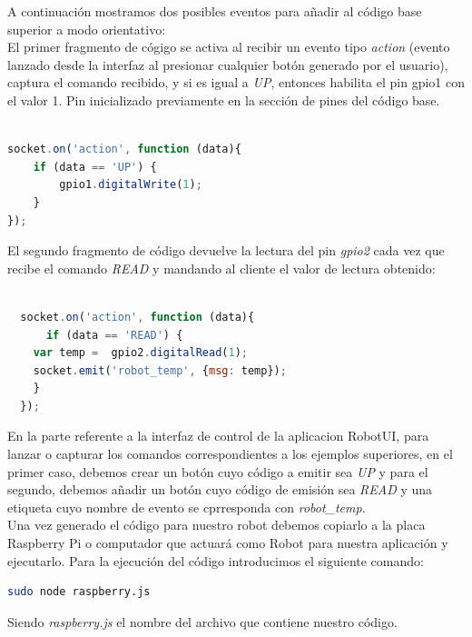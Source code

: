 A continuación mostramos dos posibles eventos para añadir al código base superior a modo orientativo:\\

El primer fragmento de cógigo se activa al recibir un evento tipo \emph{action} (evento lanzado desde la interfaz al presionar cualquier botón generado por el usuario), captura el comando recibido,
y si es igual a \emph{UP}, entonces habilita el pin gpio1 con el valor 1. Pin inicializado previamente en la sección de pines del código base.\\

\begin{lstlisting}[language=JavaScript]

socket.on('action', function (data){
    if (data == 'UP') {
        gpio1.digitalWrite(1);
    }
});

\end{lstlisting}

El segundo fragmento de código devuelve la lectura del pin \emph{gpio2} cada vez que recibe el comando \emph{READ} y mandando al cliente el valor de lectura obtenido:\\

\begin{lstlisting}[language=JavaScript]

  socket.on('action', function (data){
      if (data == 'READ') {
	var temp =  gpio2.digitalRead(1);
	socket.emit('robot_temp', {msg: temp});
    }
  });
\end{lstlisting}
 

En la parte referente a la interfaz de control de la aplicacion RobotUI, para lanzar o capturar los comandos correspondientes a los ejemplos superiores, en el primer caso, debemos crear un botón 
cuyo código a emitir sea \emph{UP} y para el segundo, debemos añadir un botón cuyo código de emisión sea \emph{READ} y una etiqueta cuyo nombre de evento se cprresponda con \emph{robot\_temp}.\\

Una vez generado el código para nuestro robot debemos copiarlo a la placa Raspberry Pi o computador que actuará como Robot para nuestra aplicación y ejecutarlo. Para la ejecución del código
introducimos el siguiente comando:\\

\begin{lstlisting}[language=bash]
  sudo node raspberry.js
\end{lstlisting}

Siendo \emph{raspberry.js} el nombre del archivo que contiene nuestro código.

